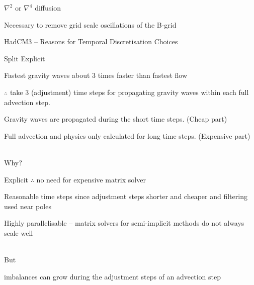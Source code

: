 \begin{slide}

\begin{list1}
\item $\nabla^2$ or $\nabla^4$ diffusion
\begin{list2}
    \item Necessary to remove grid scale oscillations of the B-grid
\end{list2}

\end{list1}

\end{slide}

\begin{slide}{HadCM3 -- Reasons for Temporal Discretisation Choices}

\begin{list1}

\item Split Explicit
\begin{list2}
    \item Fastest gravity waves about 3 times faster than fastest flow
    \item $\therefore$ take 3 (adjustment) time steps for propagating gravity waves within each full advection step.

    \item Gravity waves are propagated during the short time steps. (Cheap part)
    
    \item Full advection and physics only calculated for long time steps. (Expensive part)
\end{list2}
\end{list1}

\ \\Why?
\begin{list0}
\item Explicit $\therefore$ no need for expensive matrix solver
\item Reasonable time steps since adjustment steps shorter and cheaper and filtering used near poles
\item Highly parallelisable -- matrix solvers for semi-implicit methods do not always scale well
\end{list0}

\ \\But
\begin{list0}
\item imbalances can grow during the adjustment steps of an advection step
\end{list0}


\end{slide}
